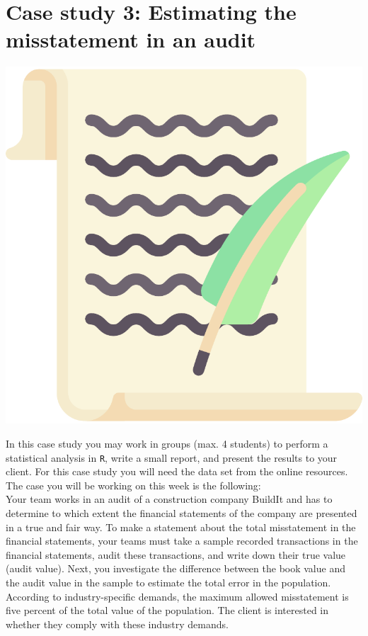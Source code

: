 
\begin{minipage}{0.8\textwidth}
\section{Case study 3: Estimating the misstatement in an audit}
\end{minipage}%
\hfill%
\begin{minipage}{0.1\textwidth}
\includegraphics[width=\linewidth]{Files/Images/lettericon.pdf}
\end{minipage}
\vspace*{.1cm}

In this case study you may work in groups (max. 4 students) to perform a statistical analysis in \texttt{R}, write a small report, and present the results to your client. For this case study you will need the data set  from the online resources. The case you will be working on this week is the following: \\

Your team works in an audit of a construction company BuildIt and has to determine to which extent the financial statements of the company are presented in a true and fair way. To make a statement about the total misstatement in the financial statements, your teams must take a sample recorded transactions in the financial statements, audit these transactions, and write down their true value (audit value). Next, you investigate the difference between the book value and the audit value in the sample to estimate the total error in the population. According to industry-specific demands, the maximum allowed misstatement is five percent of the total value of the population. The client is interested in whether they comply with these industry demands. \\

